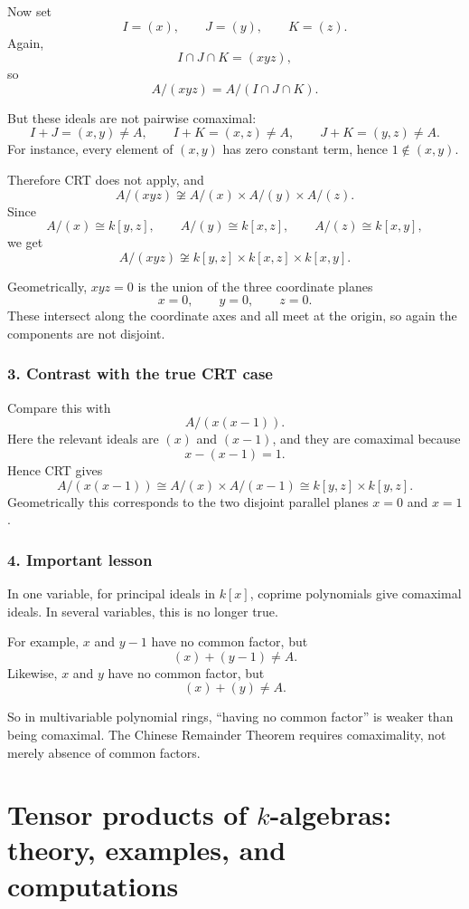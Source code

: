 \documentclass[12pt,a4paper]{article}
\theoremstyle{notespace}
\begin{document}
Now set
\[
I=(x),\qquad J=(y),\qquad K=(z).
\]
Again,
\[
I\cap J\cap K=(xyz),
\]
so
\[
A/(xyz)=A/(I\cap J\cap K).
\]

But these ideals are not pairwise comaximal:
\[
I+J=(x,y)\neq A,\qquad
I+K=(x,z)\neq A,\qquad
J+K=(y,z)\neq A.
\]
For instance, every element of \((x,y)\) has zero constant term, hence \(1\notin (x,y)\).

Therefore CRT does not apply, and
\[
A/(xyz)\not\cong A/(x)\times A/(y)\times A/(z).
\]
Since
\[
A/(x)\cong k[y,z],\qquad
A/(y)\cong k[x,z],\qquad
A/(z)\cong k[x,y],
\]
we get
\[
A/(xyz)\not\cong k[y,z]\times k[x,z]\times k[x,y].
\]

Geometrically, \(xyz=0\) is the union of the three coordinate planes
\[
x=0,\qquad y=0,\qquad z=0.
\]
These intersect along the coordinate axes and all meet at the origin, so again the components are not disjoint.

\subsubsection*{3. Contrast with the true CRT case}

Compare this with
\[
A/(x(x-1)).
\]
Here the relevant ideals are \((x)\) and \((x-1)\), and they are comaximal because
\[
x-(x-1)=1.
\]
Hence CRT gives
\[
A/(x(x-1))
\cong
A/(x)\times A/(x-1)
\cong
k[y,z]\times k[y,z].
\]
Geometrically this corresponds to the two disjoint parallel planes \(x=0\) and \(x=1\).

\subsubsection*{4. Important lesson}

In one variable, for principal ideals in \(k[x]\), coprime polynomials give comaximal ideals.
In several variables, this is no longer true.

For example, \(x\) and \(y-1\) have no common factor, but
\[
(x)+(y-1)\neq A.
\]
Likewise, \(x\) and \(y\) have no common factor, but
\[
(x)+(y)\neq A.
\]

So in multivariable polynomial rings, ``having no common factor'' is weaker than being comaximal.
The Chinese Remainder Theorem requires comaximality, not merely absence of common factors.

\section{Tensor products of \(k\)-algebras: theory, examples, and computations}
\end{document}

